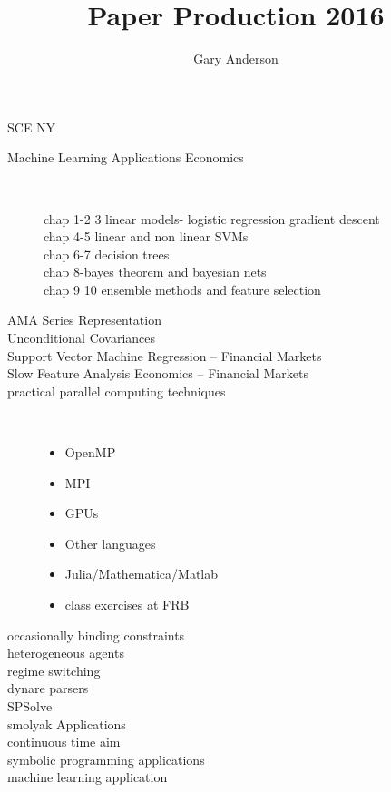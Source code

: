 \documentclass[hyperref]{labbook}
\begin{document}
\frontmatter
\title{Paper Production 2016}
\author{Gary Anderson}
\maketitle

\printindex
\tableofcontents

\mainmatter





\begin{description}
\item[SCE NY] 
\end{description}



\begin{description}
\item[Machine Learning Applications Economics] \
  \begin{description}
  \item[chap 1-2 3 linear models- logistic regression gradient descent]
  \item[chap 4-5 linear and non linear SVMs] 
  \item[chap 6-7 decision trees] 
  \item[chap 8-bayes theorem and bayesian nets] 
  \item[chap 9 10 ensemble methods and feature selection] 
  \end{description}
\item[AMA Series Representation] 
\item[Unconditional Covariances]
\item[Support Vector Machine Regression -- Financial Markets] 
\item[Slow Feature Analysis Economics -- Financial Markets] 
\item[practical parallel computing techniques] \ 
  \begin{itemize}
  \item OpenMP
  \item MPI
  \item GPUs
  \item Other languages
  \item Julia/Mathematica/Matlab
\item class exercises at FRB
  \end{itemize}
\item[occasionally binding constraints] 
\item[heterogeneous agents] 
\item[regime switching] 
\item[dynare parsers]
\item[SPSolve] 
\item[smolyak Applications] 
\item[continuous time aim] 
\item[symbolic programming applications] 
\item[machine learning application] 
\end{description}
\end{document}
